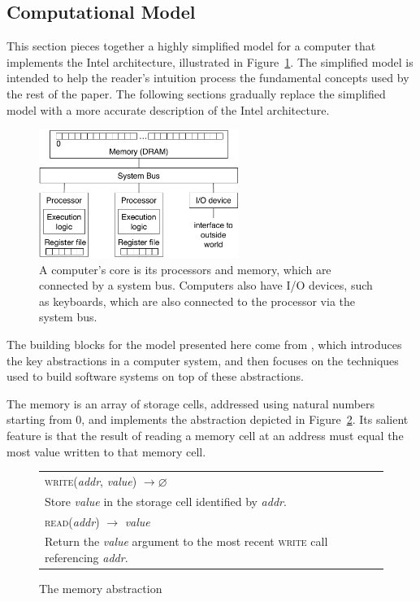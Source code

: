 \subsection{Computational Model}
\label{sec:resources}

This section pieces together a highly simplified model for a computer that
implements the Intel architecture, illustrated in
Figure~\ref{fig:computer_model}. The simplified model is intended to help the
reader's intuition process the fundamental concepts used by the rest of the
paper. The following sections gradually replace the simplified model with a
more accurate description of the Intel architecture.

\begin{figure}[hbt]
  \centering
  \includegraphics[width=65mm]{figures/computer_model.pdf}
  \caption{
    A computer's core is its processors and memory, which are connected by a
    system bus. Computers also have I/O devices, such as keyboards, which are
    also connected to the processor via the system bus.
  }
  \label{fig:computer_model}
\end{figure}


The building blocks for the model presented here come from
\cite{saltzer2009systemdesign}, which introduces the key abstractions in a
computer system, and  then focuses on the techniques used to build software
systems on top of these abstractions.

The memory is an array of storage cells, addressed using natural numbers
starting from 0, and implements the abstraction depicted in
Figure~\ref{fig:memory_abstraction}. Its salient feature is that the result of
reading a memory cell at an address must equal the most value written to that
memory cell.

\begin{figure}[hbt]
  \centering
  \begin{tabularx}{\columnwidth}{| X |}
  \hline
  \textsc{write}(\textit{addr}, \textit{value}) $ \rightarrow \varnothing $ \\
  Store \textit{value} in the storage cell identified by \textit{addr}. \\
  \hline
  \textsc{read}(\textit{addr}) $ \rightarrow $ \textit{value} \\
  Return the \textit{value} argument to the most recent \textsc{write} call
  referencing \textit{addr}. \\
  \hline
  \end{tabularx}
  \caption{The memory abstraction}
  \label{fig:memory_abstraction}
\end{figure}

